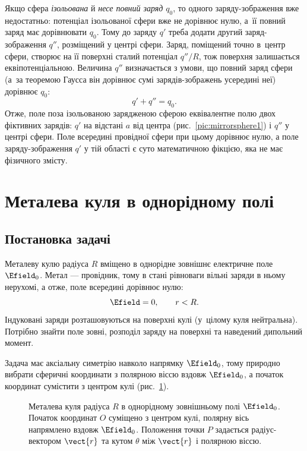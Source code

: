 Якщо сфера \emph{ізольована} й \emph{несе повний заряд $q_0$}, то одного
заряду-зображення вже недостатньо: потенціал ізольованої сфери вже не дорівнює нулю, а~її
повний заряд має дорівнювати $q_0$. Тому до заряду $q'$ треба додати другий
заряд-зображення $q''$, розміщений у центрі сфери. Заряд, поміщений точно в~центр
сфери, створює на її поверхні сталий потенціал $q''/R$, тож поверхня залишається
еквіпотенціальною. Величина $q''$ визначається з умови, що повний заряд сфери (а~за
теоремою Гаусса він дорівнює сумі зарядів-зображень усередині неї) дорівнює $q_0$:
\begin{equation*}
    q' + q'' = q_0 .
\end{equation*}
Отже, поле поза ізольованою зарядженою сферою еквівалентне полю двох фіктивних
зарядів: $q'$ на відстані $a$ від центра (рис.~\ref{pic:mirrorsphere1}) і $q''$ у
центрі сфери. Поле всередині провідної сфери при цьому дорівнює нулю, а поле
заряду-зображення $q'$ у тій області є суто математичною фікцією, яка не має
фізичного змісту.


\section{Металева куля в однорідному полі}\hypertarget{metal-sphere-in-field}{}

\subsection*{Постановка задачі}

Металеву кулю радіуса $R$ вміщено в однорідне зовнішнє
електричне поле $\Efield_0$. Метал --- провідник, тому в стані
рівноваги вільні заряди в ньому нерухомі, а отже, поле всередині
дорівнює нулю:
\begin{equation*}
    \Efield = 0, \qquad r < R .
\end{equation*}
Індуковані заряди розташовуються на поверхні кулі (у~цілому куля нейтральна). Потрібно знайти
поле зовні, розподіл заряду на поверхні та наведений дипольний момент.

Задача має аксіальну симетрію навколо напрямку $\Efield_0$, тому
природно вибрати сферичні координати з полярною віссю вздовж
$\Efield_0$, а початок координат сумістити з центром кулі (рис.~\ref{fig:sphere_in_field}).

\begin{figure}[h!]
    \centering
    \caption{Металева куля радіуса $R$ в однорідному зовнішньому полі
        $\Efield_0$. Початок координат $O$ суміщено з центром кулі, полярну
        вісь напрямлено вздовж $\Efield_0$. Положення точки $P$ задається
        радіус-вектором $\vect{r}$ та кутом $\theta$ між $\vect{r}$ і
        полярною віссю.}
    \label{fig:sphere_in_field}
\end{figure}

